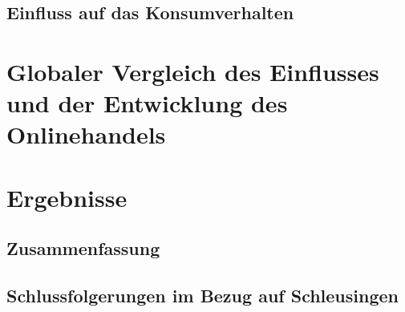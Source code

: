 \documentclass[a4paper, 12pt]{scrartcl}
\begin{document}
        \subsection{Einfluss auf das Konsumverhalten } %
            
        \newpage
            
            
            
    \section{Globaler Vergleich des Einflusses und der Entwicklung des Onlinehandels}
            
        \newpage
        
        
        
    \section{Ergebnisse}
        \subsection{Zusammenfassung}
            
        \subsection{Schlussfolgerungen im Bezug auf Schleusingen}
            
        \newpage
        
        
        
    
        \newpage
        
    \listoffigures
        \newpage
        
    
    
    \listoftables
        \newpage
    
    
\end{document}

